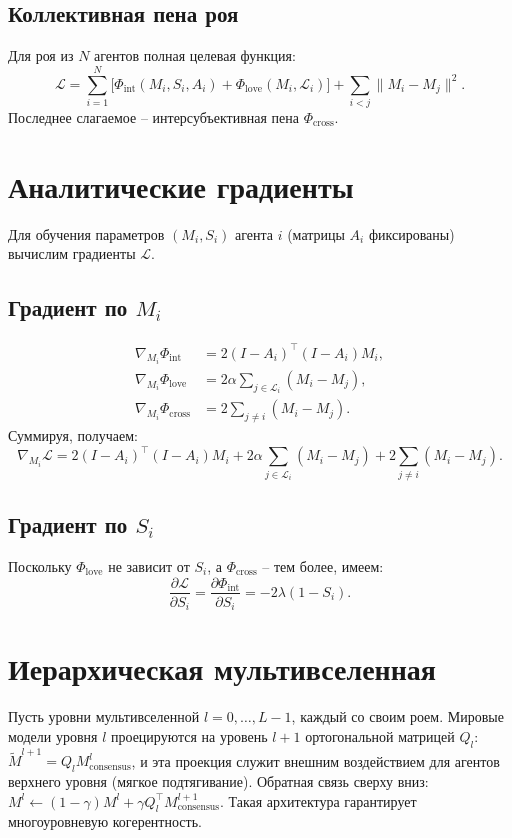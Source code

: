 \documentclass[12pt]{article}
\begin{document}
\subsection{Коллективная пена роя}
Для роя из $N$ агентов полная целевая функция:
\begin{equation}
\mathcal{L} = \sum_{i=1}^N \bigl[\Phi_{\text{int}}(M_i,S_i,A_i) + \Phi_{\text{love}}(M_i,\mathcal{L}_i)\bigr] + \sum_{i<j} \|M_i - M_j\|^2. \label{eq:total}
\end{equation}
Последнее слагаемое – интерсубъективная пена $\Phi_{\text{cross}}$.

\section{Аналитические градиенты}
Для обучения параметров $(M_i, S_i)$ агента $i$ (матрицы $A_i$ фиксированы) вычислим градиенты $\mathcal{L}$.

\subsection{Градиент по $M_i$}
\begin{align}
\nabla_{M_i} \Phi_{\text{int}} &= 2(I - A_i)^\top (I - A_i) M_i, \label{grad_int_M}\\
\nabla_{M_i} \Phi_{\text{love}} &= 2\alpha \sum_{j\in\mathcal{L}_i} (M_i - M_j), \label{grad_love_M}\\
\nabla_{M_i} \Phi_{\text{cross}} &= 2\sum_{j\neq i} (M_i - M_j). \label{grad_cross_M}
\end{align}
Суммируя, получаем:
\begin{equation}
\nabla_{M_i} \mathcal{L} = 2(I - A_i)^\top (I - A_i) M_i + 2\alpha\!\sum_{j\in\mathcal{L}_i}(M_i-M_j) + 2\sum_{j\neq i}(M_i-M_j). \label{total_grad_M}
\end{equation}

\subsection{Градиент по $S_i$}
Поскольку $\Phi_{\text{love}}$ не зависит от $S_i$, а $\Phi_{\text{cross}}$ – тем более, имеем:
\begin{equation}
\frac{\partial \mathcal{L}}{\partial S_i} = \frac{\partial \Phi_{\text{int}}}{\partial S_i} = -2\lambda(1-S_i). \label{grad_S}
\end{equation}

\section{Иерархическая мультивселенная}
Пусть уровни мультивселенной $l=0,\dots,L-1$, каждый со своим роем. Мировые модели уровня $l$ проецируются на уровень $l+1$ ортогональной матрицей $Q_l$: $\tilde{M}^{l+1} = Q_l M^l_{\text{consensus}}$, и эта проекция служит внешним воздействием для агентов верхнего уровня (мягкое подтягивание). Обратная связь сверху вниз: $M^l \leftarrow (1-\gamma)M^l + \gamma Q_l^\top M^{l+1}_{\text{consensus}}$. Такая архитектура гарантирует многоуровневую когерентность.
\end{document}
